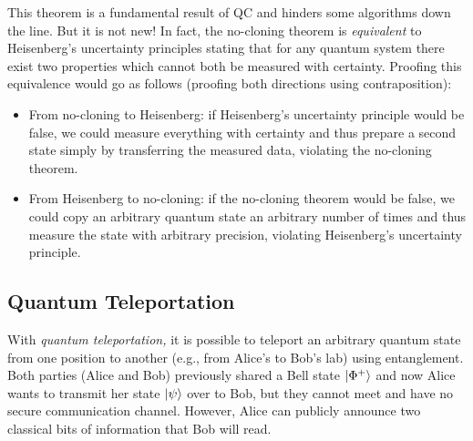 			This theorem is a fundamental result of \ac{QC} and hinders some algorithms down the line. But it is not new! In fact, the no-cloning theorem is \emph{equivalent} to Heisenberg's uncertainty principles stating that for any quantum system there exist two properties which cannot both be measured with certainty. Proofing this equivalence would go as follows (proofing both directions using contraposition):
			\begin{itemize}
				\item From no-cloning to Heisenberg: if Heisenberg's uncertainty principle would be false, we could measure everything with certainty and thus prepare a second state simply by transferring the measured data, violating the no-cloning theorem.
				\item From Heisenberg to no-cloning: if the no-cloning theorem would be false, we could copy an arbitrary quantum state an arbitrary number of times and thus measure the state with arbitrary precision, violating Heisenberg's uncertainty principle.
			\end{itemize}

		\subsection{Quantum Teleportation}
			With \emph{quantum teleportation,} it is possible to teleport an arbitrary quantum state from one position to another (e.g., from Alice's to Bob's lab) using entanglement. Both parties (Alice and Bob) previously shared a Bell state \(\ket{\Phi^+}\) and now Alice wants to transmit her state \(\ket{\psi}\) over to Bob, but they cannot meet and have no secure communication channel. However, Alice can publicly announce two classical bits of information that Bob will read.

